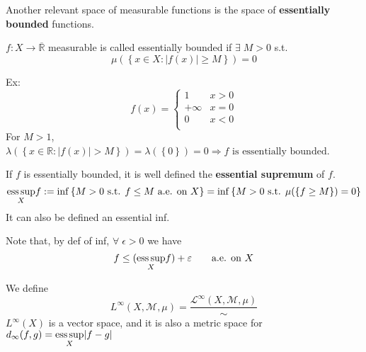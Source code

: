 Another relevant space of measurable functions is the space of \textbf{essentially bounded} functions.
\begin{definition}
    \(f : X \to \overline{\mathbb{R}}\) measurable is called essentially bounded if \(\exists \; M > 0\) s.t.
    \[
        \mu(\left\lbrace x \in X : \vert f(x) \vert \geq M \right\rbrace) = 0
    \]
\end{definition}
Ex: 
\[f(x) = \begin{cases}
    1 & x > 0 \\
+\infty & x = 0 \\
0 & x < 0 \\
\end{cases}
\] 
For \(M > 1\), \(\lambda(\left\lbrace x \in \mathbb{R} : \vert f(x) \vert > M\right\rbrace) = \lambda(\left\lbrace 0 \right\rbrace) = 0 \Longrightarrow f\mbox{ is essentially bounded}\).


If \(f\) is essentially bounded, it is well defined the \textbf{essential supremum} of \(f\).
\[
    \underset{X}{\text{ess}\, \text{sup}} f := \inf \left\lbrace M > 0 \mbox{ s.t. } f \leq M \mbox{ a.e. on }X\right\rbrace = \inf \left\lbrace M > 0 \mbox{ s.t. } \mu(\{f \geq M \})=0 \right\rbrace
\]
It can also be defined an essential inf.
\begin{remark}
    Note that, by def of inf, \(\forall \; \epsilon > 0\) we have 
    \[
        f \leq (\underset{X}{\text{ess}\, \text{sup}} f) + \varepsilon \qquad \text{a.e. on }X
    \]
\end{remark}
We define 
\[
    L^{\infty} (X, \mathcal{M}, \mu) = \frac{\mathcal{L}^{\infty}(X, \mathcal{M}, \mu)}{\sim}
\]
\(L^{\infty}(X)\) is a vector space, and it is also a metric space for \(d_{\infty}(f,g) = \underset{X}{\text{ess}\, \text{sup}} \vert f-g \vert\)
